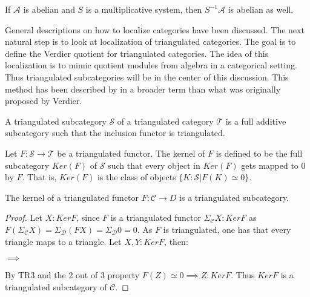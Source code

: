     \begin{corollary}
        If $\mathcal{A}$ is abelian and $S$ is a multiplicative system, then $S^{-1}\mathcal{A}$ is abelian as well.
    \end{corollary}

    General descriptions on how to localize categories have been discussed. The next natural step is to look at localization of triangulated categories. The goal is to define the Verdier quotient for triangulated categories. The idea of this localization is to mimic quotient modules from algebra in a categorical setting. Thus triangulated subcategories will be in the center of this discussion. This method has been described by \cite{neeman} in a broader term than what was originally proposed by Verdier.

    \begin{definition}
        A triangulated subcategory $\mathcal{S}$ of a triangulated category $\mathcal{T}$ is a full additive subcategory such that the inclusion functor is triangulated.
    \end{definition}

    \begin{definition}
        Let $F : \mathcal{S} \rightarrow \mathcal{T}$ be a triangulated functor. The kernel of $F$ is defined to be the full subcategory $Ker(F)$ of $\mathcal{S}$ such that every object in $Ker(F)$ gets mapped to $0$ by $F$. That is, $Ker(F)$ is the class of objects $\{K : \mathcal{S} | F(K)\simeq 0\}$.
    \end{definition}

    \begin{lemma}
        The kernel of a triangulated functor $F:\mathcal{C}\rightarrow{D}$ is a triangulated subcategory.
    \end{lemma}

    \begin{proof}
        Let $X:KerF$, since $F$ is a triangulated functor $\Sigma_{\mathcal{C}}X:KerF$ as $F(\Sigma_{\mathcal{C}}X)=\Sigma_{\mathcal{D}}(FX)=\Sigma_{\mathcal{D}}0=0$. As $F$ is triangulated, one has that every triangle maps to a triangle. Let $X,Y:KerF$, then:
        \begin{center}
            $\implies$
        \end{center}
        By TR3 and the 2 out of 3 property $F(Z)\simeq 0 \implies Z:KerF$. Thus $KerF$ is a triangulated subcategory of $\mathcal{C}$.
    \end{proof}

